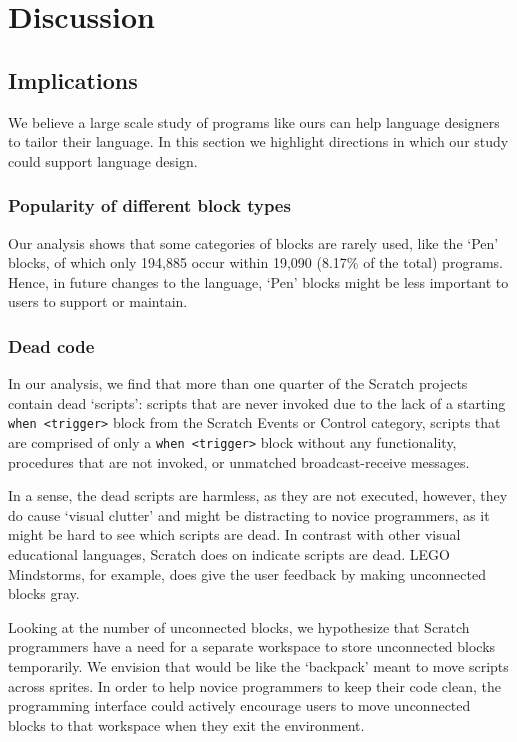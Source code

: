 \documentclass{sig-alternate}
\begin{document}
\section{Discussion}
\label{sec:discussion}
\subsection{Implications}
We believe a large scale study of programs like ours can help language designers to tailor their language. In this section we highlight directions in which our study could support language design. 

\subsubsection{Popularity of different block types}
Our analysis shows that some categories of blocks are rarely used, like the `Pen' blocks, of which only 194,885 occur within 19,090 (8.17\% of the total) programs. Hence, in future changes to the language, `Pen' blocks might be less important to users to support or maintain. 

\subsubsection{Dead code}
In our analysis, we find that more than one quarter of the Scratch projects contain dead `scripts': scripts that are never invoked due to the lack of a starting \texttt{when <trigger>} block from the Scratch Events or Control category, scripts that are comprised of only a \texttt{when <trigger>} block without any functionality, procedures that are not invoked, or unmatched broadcast-receive messages.

In a sense, the dead scripts are harmless, as they are not executed, however, they do cause `visual clutter' and might be distracting to novice programmers, as it might be hard to see which scripts are dead. In contrast with other visual educational languages, Scratch does on indicate scripts are dead. LEGO Mindstorms, for example, does give the user feedback by making unconnected blocks gray. 

Looking at the number of unconnected blocks, we hypothesize that Scratch programmers have a need for a separate workspace to store unconnected blocks temporarily. We envision that would be like the `backpack' meant to move scripts across sprites. In order to help novice programmers to keep their code clean, the programming interface could actively encourage users to move unconnected blocks to that workspace when they exit the environment.
\end{document}
